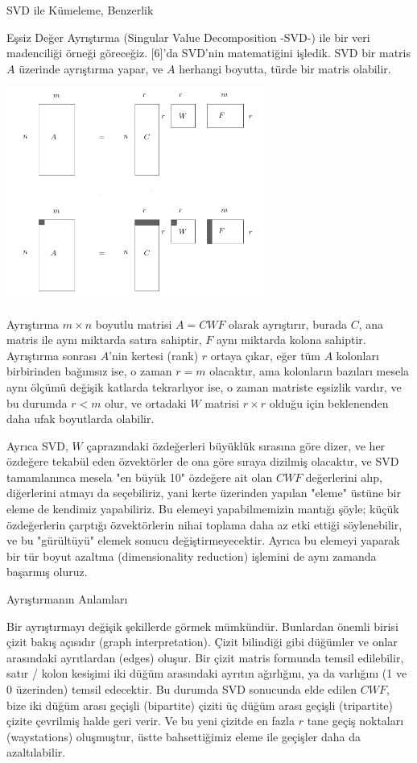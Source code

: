 \documentclass[12pt,fleqn]{article}\usepackage{../../common}
\begin{document}
SVD ile Kümeleme, Benzerlik

Eşsiz Değer Ayrıştırma (Singular Value Decomposition -SVD-) ile bir veri
madenciliği örneği göreceğiz. [6]'da SVD'nin matematiğini işledik. SVD bir
matris $A$ üzerinde ayrıştırma yapar, ve $A$ herhangi boyutta, türde bir
matris olabilir.

\includegraphics[height=7cm]{svd_1.png}

Ayrıştırma $m \times n$ boyutlu matrisi $A=CWF$ olarak ayrıştırır, burada $C$,
ana matris ile aynı miktarda satıra sahiptir, $F$ aynı miktarda kolona
sahiptir. Ayrıştırma sonrası $A$'nin kertesi (rank) $r$ ortaya çıkar, eğer tüm
$A$ kolonları birbirinden bağımsız ise, o zaman $r=m$ olacaktır, ama kolonların
bazıları mesela aynı ölçümü değişik katlarda tekrarlıyor ise, o zaman matriste
eşsizlik vardır, ve bu durumda $r < m$ olur, ve ortadaki $W$ matrisi $r \times
r$ olduğu için beklenenden daha ufak boyutlarda olabilir.

Ayrıca SVD, $W$ çaprazındaki özdeğerleri büyüklük sırasına göre dizer, ve her
özdeğere tekabül eden özvektörler de ona göre sıraya dizilmiş olacaktır, ve SVD
tamamlanınca mesela "en büyük 10" özdeğere ait olan $CWF$ değerlerini alıp,
diğerlerini atmayı da seçebiliriz, yani kerte üzerinden yapılan "eleme" üstüne
bir eleme de kendimiz yapabiliriz. Bu elemeyi yapabilmemizin mantığı şöyle;
küçük özdeğerlerin çarptığı özvektörlerin nihai toplama daha az etki ettiği
söylenebilir, ve bu "gürültüyü" elemek sonucu değiştirmeyecektir. Ayrıca bu
elemeyi yaparak bir tür boyut azaltma (dimensionality reduction) işlemini de
aynı zamanda başarmış oluruz.

Ayrıştırmanın Anlamları

Bir ayrıştırmayı değişik şekillerde görmek mümkündür. Bunlardan önemli
birisi çizit bakış açısıdır (graph interpretation). Çizit bilindiği gibi
düğümler ve onlar arasındaki ayrıtlardan (edges) oluşur. Bir çizit matris
formunda temsil edilebilir, satır / kolon kesişimi iki düğüm arasındaki
ayrıtın ağırlığını, ya da varlığını (1 ve 0 üzerinden) temsil edecektir. Bu
durumda SVD sonucunda elde edilen $CWF$, bize iki düğüm arası geçişli
(bipartite) çiziti üç düğüm arası geçişli (tripartite) çizite çevrilmiş
halde geri verir. Ve bu yeni çizitde en fazla $r$ tane geçiş noktaları
(waystations) oluşmuştur, üstte bahsettiğimiz eleme ile geçişler daha da
azaltılabilir.
\end{document}
